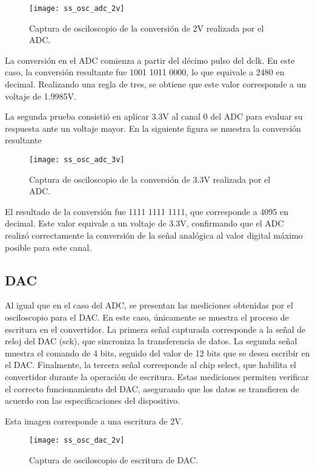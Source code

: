             \begin{figure}[hbtp]
                \centering
                \texttt{[image: ss\_osc\_adc\_2v]}
                \caption{Captura de osciloscopio de la conversión de 2V realizada por el ADC.}
                \label{fig:ss_osc_adc_2v}
            \end{figure} 

La conversión en el ADC comienza a partir del décimo pulso del dclk. En este caso, la conversión resultante fue 1001 1011 0000, lo que equivale a 2480 en decimal. Realizando una regla de tres, se obtiene que este valor corresponde a un voltaje de 1.9985V.


La segunda prueba consistió en aplicar 3.3V al canal 0 del ADC para evaluar su respuesta ante un voltaje mayor. En la siguiente figura se muestra la conversión resultante
            \begin{figure}[hbtp]
                \centering
                \texttt{[image: ss\_osc\_adc\_3v]}
                \caption{Captura de osciloscopio de la conversión de 3.3V realizada por el ADC.}
                \label{fig:ss_osc_adc_3v}
            \end{figure} 

El resultado de la conversión fue 1111 1111 1111, que corresponde a 4095 en decimal. Este valor equivale a un voltaje de 3.3V, confirmando que el ADC realizó correctamente la conversión de la señal analógica al valor digital máximo posible para este canal.
     
\subsection{DAC}
Al igual que en el caso del ADC, se presentan las mediciones obtenidas por el osciloscopio para el DAC. En este caso, únicamente se muestra el proceso de escritura en el convertidor. La primera señal capturada corresponde a la señal de reloj del DAC (sck), que sincroniza la transferencia de datos. La segunda señal muestra el comando de 4 bits, seguido del valor de 12 bits que se desea escribir en el DAC. Finalmente, la tercera señal corresponde al chip select, que habilita el convertidor durante la operación de escritura. Estas mediciones permiten verificar el correcto funcionamiento del DAC, asegurando que los datos se transfieren de acuerdo con las especificaciones del dispositivo.


Esta imagen corresponde a una escritura de 2V.
            \begin{figure}[hbtp]
                \centering
                \texttt{[image: ss\_osc\_dac\_2v]}
                \caption{Captura de osciloscopio de escritura de DAC.}
                \label{fig:ss_osc_dac_2v}
            \end{figure}
            
